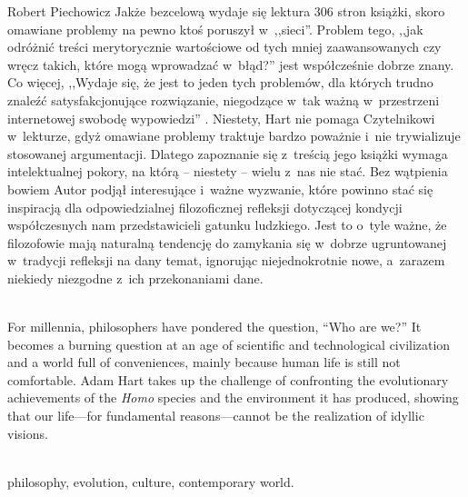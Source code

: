 \begin{newrevplenv}{Robert Piechowicz}
Jakże bezcelową wydaje się lektura 306 stron książki, skoro omawiane problemy na pewno ktoś poruszył w~,,sieci''. Problem tego, ,,jak odróżnić treści merytorycznie wartościowe od tych mniej zaawansowanych czy wręcz takich, które mogą wprowadzać w~błąd?'' jest współcześnie dobrze znany. Co więcej, ,,Wydaje się, że jest to jeden tych problemów, dla których trudno znaleźć satysfakcjonujące rozwiązanie, niegodzące w~tak ważną w~przestrzeni internetowej swobodę wypowiedzi''
\parencite[][s.~255]{polak_internetowe_2021}. %
 Niestety, Hart nie pomaga Czytelnikowi w~lekturze, gdyż omawiane problemy traktuje bardzo poważnie i~nie trywializuje stosowanej argumentacji. Dlatego zapoznanie się z~treścią jego książki wymaga intelektualnej pokory, na którą -- niestety -- wielu z~nas nie stać. Bez wątpienia bowiem Autor podjął interesujące i~ważne wyzwanie, które powinno stać się inspiracją dla odpowiedzialnej filozoficznej refleksji dotyczącej kondycji współczesnych nam przedstawicieli gatunku ludzkiego. Jest to o~tyle ważne, że filozofowie mają naturalną tendencję do zamykania się w~dobrze ugruntowanej w~tradycji refleksji na dany temat, ignorując niejednokrotnie nowe, a~zarazem niekiedy niezgodne z~ich przekonaniami dane.







\vspace{5mm}%
\begin{flushright}
{\chaptitleeng{}}
\end{flushright}

{}\\
{For millennia, philosophers have pondered the question, ``Who are we?'' It becomes a burning question at an age of scientific and technological civilization and a world full of conveniences, mainly because human life is still not comfortable. Adam Hart takes up the challenge of confronting the evolutionary
achievements of the \textit{Homo} species and the environment it has produced, showing that our life---for
fundamental reasons---cannot be the realization of idyllic visions.
}\par%
\vspace{2mm}%
{}\\%
{philosophy, evolution, culture, contemporary world.}%





\end{newrevplenv}
